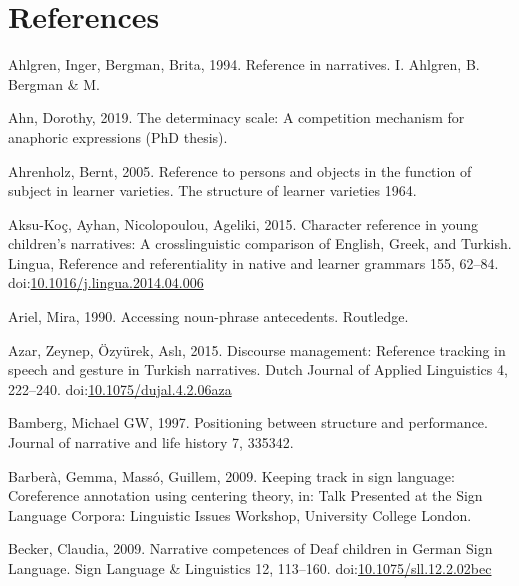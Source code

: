 \documentclass[]{elsarticle} %
\newlength{\cslhangindent}
\newenvironment{CSLReferences}[2] %
 {%
  \setlength{\parindent}{0pt}
  \ifodd #1 \everypar{\setlength{\hangindent}{\cslhangindent}}\ignorespaces\fi
  \ifnum #2 > 0
  \setlength{\parskip}{#2\baselineskip}
  \fi
 }%
 {}
\begin{document}
\clearpage

\hypertarget{references}{%
\section*{References}\label{references}}

\hypertarget{refs}{}
\begin{CSLReferences}{1}{0}
\leavevmode{}%
Ahlgren, Inger, Bergman, Brita, 1994. Reference in narratives. I.
Ahlgren, B. Bergman \& M.

\leavevmode{}%
Ahn, Dorothy, 2019. The determinacy scale: A competition mechanism for
anaphoric expressions (PhD thesis).

\leavevmode{}%
Ahrenholz, Bernt, 2005. Reference to persons and objects in the function
of subject in learner varieties. The structure of learner varieties
1964.

\leavevmode{}%
Aksu-Koç, Ayhan, Nicolopoulou, Ageliki, 2015. Character reference in
young children's narratives: A crosslinguistic comparison of English,
Greek, and Turkish. Lingua, Reference and referentiality in native and
learner grammars 155, 62--84.
doi:\href{https://doi.org/10.1016/j.lingua.2014.04.006}{10.1016/j.lingua.2014.04.006}

\leavevmode{}%
Ariel, Mira, 1990. Accessing noun-phrase antecedents. Routledge.

\leavevmode{}%
Azar, Zeynep, Özyürek, Aslı, 2015. Discourse management: Reference
tracking in speech and gesture in Turkish narratives. Dutch Journal of
Applied Linguistics 4, 222--240.
doi:\href{https://doi.org/10.1075/dujal.4.2.06aza}{10.1075/dujal.4.2.06aza}

\leavevmode{}%
Bamberg, Michael GW, 1997. Positioning between structure and
performance. Journal of narrative and life history 7, 335342.

\leavevmode{}%
Barberà, Gemma, Massó, Guillem, 2009. Keeping track in sign language:
Coreference annotation using centering theory, in: Talk Presented at the
Sign Language Corpora: Linguistic Issues Workshop, University College
London.

\leavevmode{}%
Becker, Claudia, 2009. Narrative competences of Deaf children in German
Sign Language. Sign Language \& Linguistics 12, 113--160.
doi:\href{https://doi.org/10.1075/sll.12.2.02bec}{10.1075/sll.12.2.02bec}


\end{CSLReferences}
\end{document}
